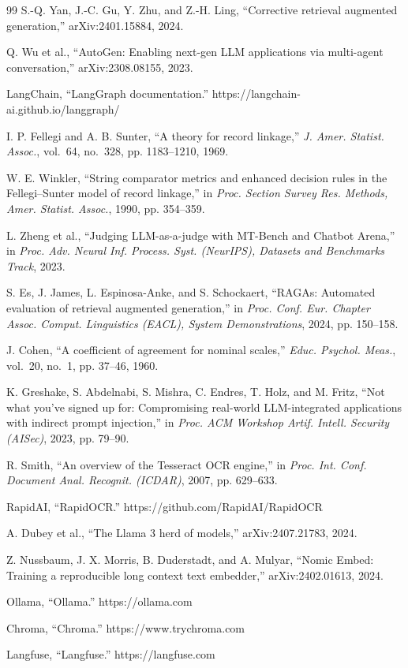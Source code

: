 \begin{thebibliography}{99}
 S.-Q. Yan, J.-C. Gu, Y. Zhu, and Z.-H. Ling, ``Corrective retrieval augmented generation,'' arXiv:2401.15884, 2024.

 Q. Wu et al., ``AutoGen: Enabling next-gen LLM applications via multi-agent conversation,'' arXiv:2308.08155, 2023.

 LangChain, ``LangGraph documentation.'' https://langchain-ai.github.io/langgraph/

 I. P. Fellegi and A. B. Sunter, ``A theory for record linkage,'' \emph{J. Amer. Statist. Assoc.}, vol.~64, no.~328, pp. 1183--1210, 1969.

 W. E. Winkler, ``String comparator metrics and enhanced decision rules in the Fellegi--Sunter model of record linkage,'' in \emph{Proc. Section Survey Res. Methods, Amer. Statist. Assoc.}, 1990, pp. 354--359.

 L. Zheng et al., ``Judging LLM-as-a-judge with MT-Bench and Chatbot Arena,'' in \emph{Proc. Adv. Neural Inf. Process. Syst. (NeurIPS), Datasets and Benchmarks Track}, 2023.

 S. Es, J. James, L. Espinosa-Anke, and S. Schockaert, ``RAGAs: Automated evaluation of retrieval augmented generation,'' in \emph{Proc. Conf. Eur. Chapter Assoc. Comput. Linguistics (EACL), System Demonstrations}, 2024, pp. 150--158.

 J. Cohen, ``A coefficient of agreement for nominal scales,'' \emph{Educ. Psychol. Meas.}, vol.~20, no.~1, pp. 37--46, 1960.

 K. Greshake, S. Abdelnabi, S. Mishra, C. Endres, T. Holz, and M. Fritz, ``Not what you've signed up for: Compromising real-world LLM-integrated applications with indirect prompt injection,'' in \emph{Proc. ACM Workshop Artif. Intell. Security (AISec)}, 2023, pp. 79--90.

 R. Smith, ``An overview of the Tesseract OCR engine,'' in \emph{Proc. Int. Conf. Document Anal. Recognit. (ICDAR)}, 2007, pp. 629--633.

 RapidAI, ``RapidOCR.'' https://github.com/RapidAI/RapidOCR

 A. Dubey et al., ``The Llama 3 herd of models,'' arXiv:2407.21783, 2024.

 Z. Nussbaum, J. X. Morris, B. Duderstadt, and A. Mulyar, ``Nomic Embed: Training a reproducible long context text embedder,'' arXiv:2402.01613, 2024.

 Ollama, ``Ollama.'' https://ollama.com

 Chroma, ``Chroma.'' https://www.trychroma.com

 Langfuse, ``Langfuse.'' https://langfuse.com
\end{thebibliography}

